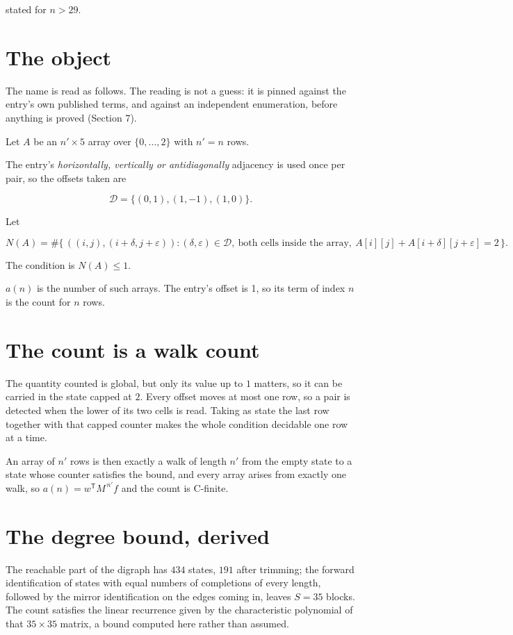 \documentclass[11pt]{article}
\theoremstyle{definition}
\begin{document}
stated for $n > 29$.

\section{The object}

The name is read as follows. The reading is not a guess: it is pinned against the entry's own published terms, and against an independent enumeration, before anything is proved (Section 7).

Let $A$ be an $n' \times 5$ array over $\{0,\dots,2\}$ with $n' = n$ rows.

The entry's {\itshape horizontally, vertically or antidiagonally} adjacency is used once per pair, so the offsets taken are

\[\mathcal{D} = \{(0,1), (1,-1), (1,0)\}.\]

Let

\[N(A) = \#\bigl\{\,((i,j),(i{+}\delta,j{+}\varepsilon)) : (\delta,\varepsilon) \in \mathcal{D},\ \text{both cells inside the array},\ A[i][j] + A[i{+}\delta][j{+}\varepsilon] = 2\,\bigr\}.\]

The condition is $N(A) \le 1$.

$a(n)$ is the number of such arrays. The entry's offset is 1, so its term of index $n$ is the count for $n$ rows.

\section{The count is a walk count}

The quantity counted is global, but only its value up to $1$ matters, so it can be carried in the state capped at $2$. Every offset moves at most one row, so a pair is detected when the lower of its two cells is read. Taking as state the last row together with that capped counter makes the whole condition decidable one row at a time.

An array of $n'$ rows is then exactly a walk of length $n'$ from the empty state to a state whose counter satisfies the bound, and every array arises from exactly one walk, so $a(n) = w^{\mathsf T}M^{\,n'}f$ and the count is C-finite.

\section{The degree bound, derived}

The reachable part of the digraph has $434$ states, $191$ after trimming; the forward identification of states with equal numbers of completions of every length, followed by the mirror identification on the edges coming in, leaves $S = 35$ blocks. The count satisfies the linear recurrence given by the characteristic polynomial of that $35\times35$ matrix, a bound computed here rather than assumed.
\end{document}
